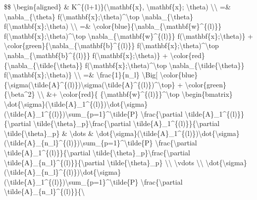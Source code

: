 \$\$ \textbackslash begin\{aligned\} \& K\^{}\{(l+1)\}(\textbackslash mathbf\{x\}, \textbackslash mathbf\{x\}\textquotesingle; \textbackslash theta) \textbackslash\textbackslash{} =\& \textbackslash nabla\_\{\textbackslash theta\} f(\textbackslash mathbf\{x\};\textbackslash theta)\^{}\textbackslash top \textbackslash nabla\_\{\textbackslash theta\} f(\textbackslash mathbf\{x\};\textbackslash theta) \textbackslash\textbackslash{} =\& \textbackslash color\{blue\}\{\textbackslash nabla\_\{\textbackslash mathbf\{w\}\^{}\{(l)\}\} f(\textbackslash mathbf\{x\};\textbackslash theta)\^{}\textbackslash top \textbackslash nabla\_\{\textbackslash mathbf\{w\}\^{}\{(l)\}\} f(\textbackslash mathbf\{x\};\textbackslash theta)\} + \textbackslash color\{green\}\{\textbackslash nabla\_\{\textbackslash mathbf\{b\}\^{}\{(l)\}\} f(\textbackslash mathbf\{x\};\textbackslash theta)\^{}\textbackslash top \textbackslash nabla\_\{\textbackslash mathbf\{b\}\^{}\{(l)\}\} f(\textbackslash mathbf\{x\};\textbackslash theta)\} + \textbackslash color\{red\}\{\textbackslash nabla\_\{\textbackslash tilde\{\textbackslash theta\}\} f(\textbackslash mathbf\{x\};\textbackslash theta)\^{}\textbackslash top \textbackslash nabla\_\{\textbackslash tilde\{\textbackslash theta\}\} f(\textbackslash mathbf\{x\};\textbackslash theta)\} \textbackslash\textbackslash{} =\& \textbackslash frac\{1\}\{n\_l\} \textbackslash Big{[} \textbackslash color\{blue\}\{\textbackslash sigma(\textbackslash tilde\{A\}\^{}\{(l)\})\textbackslash sigma(\textbackslash tilde\{A\}\^{}\{(l)\})\^{}\textbackslash top\} + \textbackslash color\{green\}\{\textbackslash beta\^{}2\} \textbackslash\textbackslash{} \&+ \textbackslash color\{red\}\{ \{\textbackslash mathbf\{w\}\^{}\{(l)\}\}\^{}\textbackslash top \textbackslash begin\{bmatrix\} \textbackslash dot\{\textbackslash sigma\}(\textbackslash tilde\{A\}\_1\^{}\{(l)\})\textbackslash dot\{\textbackslash sigma\}(\textbackslash tilde\{A\}\_1\^{}\{(l)\})\textbackslash sum\_\{p=1\}\^{}\textbackslash tilde\{P\} \textbackslash frac\{\textbackslash partial \textbackslash tilde\{A\}\_1\^{}\{(l)\}\}\{\textbackslash partial \textbackslash tilde\{\textbackslash theta\}\_p\}\textbackslash frac\{\textbackslash partial \textbackslash tilde\{A\}\_1\^{}\{(l)\}\}\{\textbackslash partial \textbackslash tilde\{\textbackslash theta\}\_p\} \& \textbackslash dots \& \textbackslash dot\{\textbackslash sigma\}(\textbackslash tilde\{A\}\_1\^{}\{(l)\})\textbackslash dot\{\textbackslash sigma\}(\textbackslash tilde\{A\}\_\{n\_l\}\^{}\{(l)\})\textbackslash sum\_\{p=1\}\^{}\textbackslash tilde\{P\} \textbackslash frac\{\textbackslash partial \textbackslash tilde\{A\}\_1\^{}\{(l)\}\}\{\textbackslash partial \textbackslash tilde\{\textbackslash theta\}\_p\}\textbackslash frac\{\textbackslash partial \textbackslash tilde\{A\}\_\{n\_l\}\^{}\{(l)\}\}\{\textbackslash partial \textbackslash tilde\{\textbackslash theta\}\_p\} \textbackslash\textbackslash{} \textbackslash vdots \textbackslash\textbackslash{} \textbackslash dot\{\textbackslash sigma\}(\textbackslash tilde\{A\}\_\{n\_l\}\^{}\{(l)\})\textbackslash dot\{\textbackslash sigma\}(\textbackslash tilde\{A\}\_1\^{}\{(l)\})\textbackslash sum\_\{p=1\}\^{}\textbackslash tilde\{P\} \textbackslash frac\{\textbackslash partial \textbackslash tilde\{A\}\_\{n\_l\}\^{}\{(l)\}\}\{\textbackslash 